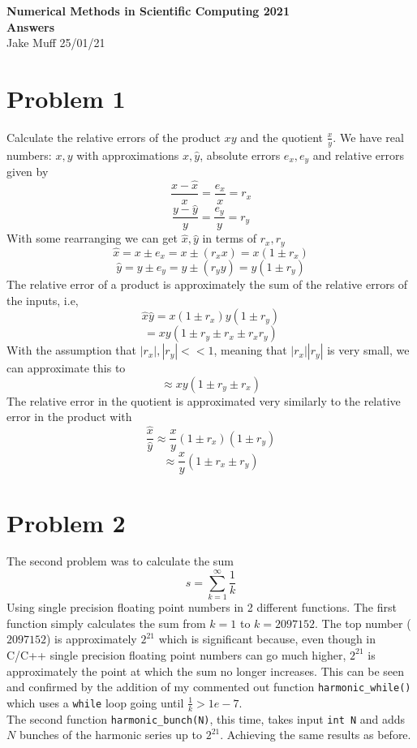 \documentclass[12pt]{article}
\begin{document}
\normalsize

\baselineskip 14pt

\begin{center}
{\Large {\bf Numerical Methods in Scientific Computing 2021 \ \ \\ Answers}} \\
Jake Muff
25/01/21
\end{center}
\section*{Problem 1}
Calculate the relative errors of the product $xy$ and the quotient $\frac{x}{y}$. We have real numbers: $x,y$
with approximations $\hat{x}, \hat{y}$, absolute errors $e_x, e_y$ and relative errors given by 
$$ \frac{x-\hat{x}}{x} = \frac{e_x}{x} = r_x $$
$$ \frac{y-\hat{y}}{y} = \frac{e_y}{y} = r_y $$
With some rearranging we can get $\hat{x}, \hat{y}$ in terms of $r_x, r_y$ 
$$ \hat{x} = x \pm e_x = x \pm (r_x x) = x(1 \pm r_x) $$
$$ \hat{y} = y \pm e_y = y \pm (r_y y) = y(1 \pm r_y) $$
The relative error of a product is approximately the sum of the relative errors of the inputs, i.e, 
$$ \hat{x} \hat{y} = x(1 \pm r_x) y(1 \pm r_y) $$
$$ = xy ( 1 \pm r_y \pm r_x \pm r_x r_y ) $$ 
With the assumption that $|r_x|, |r_y| << 1$, meaning that $|r_x||r_y|$ is very small, we can approximate this to 
$$ \approx xy (1 \pm r_y \pm r_x ) $$
The relative error in the quotient is approximated very similarly to the relative error in the product with 
$$ \frac{\hat{x}}{\hat{y}} \approx \frac{x}{y} (1 \pm r_x)(1 \pm r_y) $$
$$ \approx \frac{x}{y}(1 \pm r_x \pm r_y) $$


\section*{Problem 2}
The second problem was to calculate the sum 
$$ s = \sum_{k=1}^{\infty} \frac{1}{k} $$ 
Using single precision floating point numbers in 2 different functions. The first function simply calculates the sum from
$k=1$ to $k= 2097152$. The top number ($2097152$) is approximately $2^{21}$ which is significant because, even though in C/C++ single precision floating point numbers can go much higher,
$2^{21}$ is approximately the point at which the sum no longer increases. This can be seen and confirmed by the addition of my commented out function \lstinline{harmonic_while()} which uses a 
\lstinline{while} loop going until $ \frac{1}{k} > 1e-7 $. 
\\
The second function \lstinline{harmonic_bunch(N)}, this time, takes input \lstinline{int N} and adds $N$ bunches of the harmonic series up to $2^{21}$. Achieving the same results as before.
\end{document}
